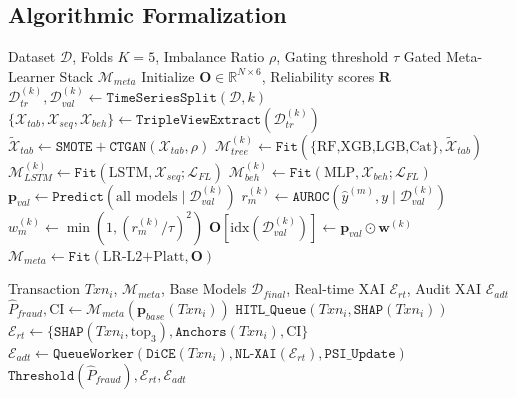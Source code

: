 \documentclass[10pt,a4paper,twocolumn]{article}
\begin{document}
\subsection{Algorithmic Formalization}
\begin{algorithm}[H]
\caption{Temporal Walk-Forward Triple-View Training}
\label{alg:train}
\algrenewcommand{}
\algrenewcommand{}
\footnotesize
\begin{algorithmic}[1]
\Require Dataset $\mathcal{D}$, Folds $K{=}5$, Imbalance Ratio $\rho$, Gating threshold $\tau$
\Ensure Gated Meta-Learner Stack $\mathcal{M}_{meta}$
\State Initialize $\mathbf{O} \in \mathbb{R}^{N \times 6}$, Reliability scores $\mathbf{R}$
    \State $\mathcal{D}_{tr}^{(k)}, \mathcal{D}_{val}^{(k)} \gets \mathtt{TimeSeriesSplit}(\mathcal{D}, k)$
    \State $\{\mathcal{X}_{tab}, \mathcal{X}_{seq}, \mathcal{X}_{beh}\} \gets \mathtt{TripleViewExtract}(\mathcal{D}_{tr}^{(k)})$
    \State $\tilde{\mathcal{X}}_{tab} \gets \mathtt{SMOTE+CTGAN}(\mathcal{X}_{tab}, \rho)$ 
    \State $\mathcal{M}_{tree}^{(k)} \gets \mathtt{Fit}(\{\text{RF,XGB,LGB,Cat}\}, \tilde{\mathcal{X}}_{tab})$
    \State $\mathcal{M}_{LSTM}^{(k)} \gets \mathtt{Fit}(\text{LSTM}, \mathcal{X}_{seq};\mathcal{L}_{FL})$
    \State $\mathcal{M}_{beh}^{(k)} \gets \mathtt{Fit}(\text{MLP}, \mathcal{X}_{beh};\mathcal{L}_{FL})$
    \State $\mathbf{p}_{val} \gets \mathtt{Predict}(\text{all models} \mid \mathcal{D}_{val}^{(k)})$
        \State $r_m^{(k)} \gets \mathtt{AUROC}(\hat{y}^{(m)}, y \mid \mathcal{D}_{val}^{(k)})$
        \State $w_m^{(k)} \gets \min(1, (r_m^{(k)}/\tau)^2)$ 
    \EndFor
    \State $\mathbf{O}[\text{idx}(\mathcal{D}_{val}^{(k)})] \gets \mathbf{p}_{val} \odot \mathbf{w}^{(k)}$
\EndFor
\State $\mathcal{M}_{meta} \gets \mathtt{Fit}(\text{LR-L2+Platt}, \mathbf{O})$
\end{algorithmic}
\end{algorithm}

\begin{algorithm}[H]
\caption{Dual-Stream XAI Inference with NL Explanation}
\label{alg:infer}
\algrenewcommand{}
\algrenewcommand{}
\footnotesize
\begin{algorithmic}[1]
\Require Transaction $Txn_i$, $\mathcal{M}_{meta}$, Base Models
\Ensure $\mathcal{D}_{final}$, Real-time XAI $\mathcal{E}_{rt}$, Audit XAI $\mathcal{E}_{adt}$
\State $\hat{P}_{fraud}, \text{CI} \gets \mathcal{M}_{meta}(\mathbf{p}_{base}(Txn_i))$ 
\If{$\hat{P}_{fraud} \in [0.35, 0.60)$ \textbf{or} $Txn_{amt} \geq 95^{\text{th}}\text{-pct}$}
    \State \Return $\mathtt{HITL\_Queue}(Txn_i, \mathtt{SHAP}(Txn_i))$
\EndIf
\State $\mathcal{E}_{rt} \gets \{\mathtt{SHAP}(Txn_i, \text{top}_3), \mathtt{Anchors}(Txn_i), \text{CI}\}$
\State $\mathcal{E}_{adt} \gets \mathtt{QueueWorker}(\mathtt{DiCE}(Txn_i), \mathtt{NL\text{-}XAI}(\mathcal{E}_{rt}), \mathtt{PSI\_Update})$
\State \Return $\mathtt{Threshold}(\hat{P}_{fraud}), \mathcal{E}_{rt}, \mathcal{E}_{adt}$
\end{algorithmic}
\end{algorithm}
\end{document}
